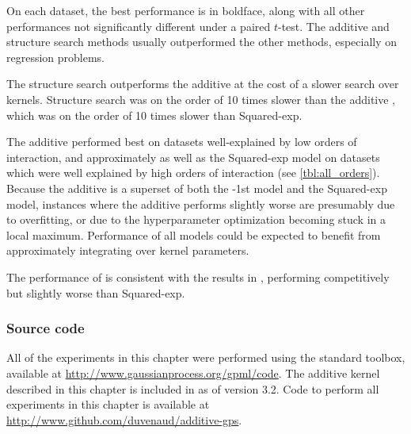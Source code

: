 On each dataset, the best performance is in boldface, along with all other performances not significantly different under a paired $t$-test.
The additive and structure search methods usually outperformed the other methods, especially on regression problems.


The structure search outperforms the additive \gp{} at the cost of a slower search over kernels.
Structure search was on the order of 10 times slower than the additive \gp{}, which was on the order of 10 times slower than \gp{} Squared-exp.

The additive \gp{} performed best on datasets well-explained by low orders of interaction, and approximately as well as the \gp{} Squared-exp model on datasets which were well explained by high orders of interaction (see \cref{tbl:all_orders}).
Because the additive \gp{} is a superset of both the \gp{}-1st model and the \gp{} Squared-exp model, instances where the additive \gp{} performs slightly worse are presumably due to overfitting, or due to the hyperparameter optimization becoming stuck in a local maximum. %
Performance of all \gp{} models could be expected to benefit from approximately integrating over kernel parameters.

The performance of \HKL{} is consistent with the results in \citet{Bach_HKL}, performing competitively but slightly worse than \gp{} Squared-exp.


\subsubsection{Source code}

All of the experiments in this chapter were performed using the standard \GPML{} toolbox, available at \url{http://www.gaussianprocess.org/gpml/code}.
The additive kernel described in this chapter is included in \GPML{} as of version 3.2.
Code to perform all experiments in this chapter is available at \url{http://www.github.com/duvenaud/additive-gps}.





